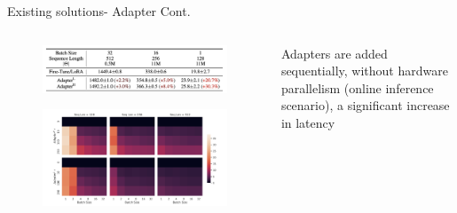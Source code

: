 \documentclass[aspectratio=169,xcolor=dvipsnames]{beamer}
\begin{document}
\begin{frame}{Existing solutions- Adapter Cont.}
    \begin{columns}
        \begin{column}{0.7\textwidth}
            \begin{figure}
            \centering
            \includegraphics[width=0.8\linewidth]{figures/adapter_latency.png}
            \end{figure}
            \begin{figure}
            \centering
            \includegraphics[width=0.9\linewidth]{figures/adapter_parallelsim_latency.png}
            \end{figure}
        \end{column}
        \begin{column}{0.3\textwidth}
            Adapters are added sequentially, without hardware parallelism (online inference scenario), a significant increase in latency 
        \end{column}
    \end{columns}
\end{frame}

\end{document}
